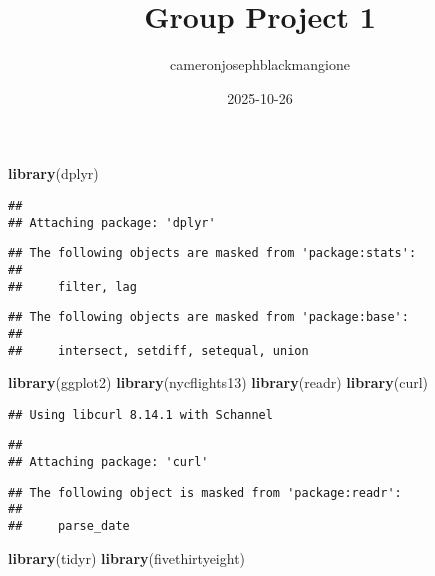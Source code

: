 \documentclass[
]{article}
\title{Group Project 1}
\author{cameronjosephblackmangione}
\date{2025-10-26}
\newenvironment{Shaded}{\begin{snugshade}}{\end{snugshade}}
\newcommand{\FunctionTok}[1]{\textcolor[rgb]{0.13,0.29,0.53}{\textbf{#1}}}
\newcommand{\NormalTok}[1]{#1}
\begin{document}
\maketitle

\begin{Shaded}
\begin{Highlighting}[]
\FunctionTok{library}\NormalTok{(dplyr)}
\end{Highlighting}
\end{Shaded}

\begin{verbatim}
## 
## Attaching package: 'dplyr'
\end{verbatim}

\begin{verbatim}
## The following objects are masked from 'package:stats':
## 
##     filter, lag
\end{verbatim}

\begin{verbatim}
## The following objects are masked from 'package:base':
## 
##     intersect, setdiff, setequal, union
\end{verbatim}

\begin{Shaded}
\begin{Highlighting}[]
\FunctionTok{library}\NormalTok{(ggplot2)}
\FunctionTok{library}\NormalTok{(nycflights13)}
\FunctionTok{library}\NormalTok{(readr)}
\FunctionTok{library}\NormalTok{(curl)}
\end{Highlighting}
\end{Shaded}

\begin{verbatim}
## Using libcurl 8.14.1 with Schannel
\end{verbatim}

\begin{verbatim}
## 
## Attaching package: 'curl'
\end{verbatim}

\begin{verbatim}
## The following object is masked from 'package:readr':
## 
##     parse_date
\end{verbatim}

\begin{Shaded}
\begin{Highlighting}[]
\FunctionTok{library}\NormalTok{(tidyr)}
\FunctionTok{library}\NormalTok{(fivethirtyeight)}
\end{Highlighting}
\end{Shaded}
\end{document}
